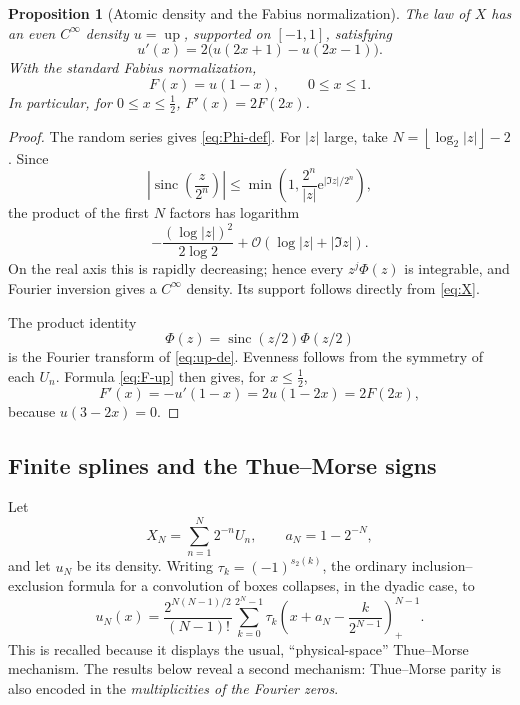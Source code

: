 \documentclass[11pt,oneside]{article}
\newtheorem{proposition}[theorem]{Proposition}
\theoremstyle{definition}
\theoremstyle{remark}
\newcommand{\Up}{\operatorname{up}}
\newcommand{\sinc}{\operatorname{sinc}}
\newcommand{\e}{\mathrm e}
\newcommand{\bigO}{\mathcal O}
\begin{document}
\begin{proposition}[Atomic density and the Fabius normalization]
\label{prop:density}
The law of \(X\) has an even \(C^\infty\) density \(u=\Up\), supported on
\([-1,1]\), satisfying
\begin{equation}
 u'(x)=2\bigl(u(2x+1)-u(2x-1)\bigr).
 \label{eq:up-de}
\end{equation}
With the standard Fabius normalization,
\begin{equation}
 F(x)=u(1-x),\qquad 0\leq x\leq1.
 \label{eq:F-up}
\end{equation}
In particular, for \(0\leq x\leq\frac12\),
\(F'(x)=2F(2x)\).
\end{proposition}

\begin{proof}
The random series gives \eqref{eq:Phi-def}.  For \(|z|\) large, take
\(N=\left\lfloor\log_2|z|\right\rfloor-2\).  Since
\[
 \left|\sinc\!\left(\frac z{2^n}\right)\right|
 \leq \min\!\left(1,\frac{2^n}{|z|}\e^{|\Im z|/2^n}\right),
\]
the product of the first \(N\) factors has logarithm
\[
 -\frac{(\log|z|)^2}{2\log2}+\bigO(\log|z|+|\Im z|).
\]
On the real axis this is rapidly decreasing; hence every
\(z^j\Phi(z)\) is integrable, and Fourier inversion gives a \(C^\infty\)
density.  Its support follows directly from \eqref{eq:X}.

The product identity
\[
 \Phi(z)=\sinc(z/2)\Phi(z/2)
\]
is the Fourier transform of \eqref{eq:up-de}.  Evenness follows from the
symmetry of each \(U_n\).  Formula \eqref{eq:F-up} then gives, for
\(x\leq\frac12\),
\[
 F'(x)=-u'(1-x)
      =2u(1-2x)=2F(2x),
\]
because \(u(3-2x)=0\).
\end{proof}

\subsection{Finite splines and the Thue--Morse signs}

Let
\[
 X_N=\sum_{n=1}^{N}2^{-n}U_n,
 \qquad
 a_N=1-2^{-N},
\]
and let \(u_N\) be its density.  Writing
\(\tau_k=(-1)^{s_2(k)}\), the ordinary inclusion--exclusion formula for a
convolution of boxes collapses, in the dyadic case, to
\begin{equation}
 u_N(x)=
 \frac{2^{N(N-1)/2}}{(N-1)!}
 \sum_{k=0}^{2^N-1}
 \tau_k
 \left(
   x+a_N-\frac{k}{2^{N-1}}
 \right)_{+}^{N-1}.
 \label{eq:finite-spline}
\end{equation}
This is recalled because it displays the usual, ``physical-space''
Thue--Morse mechanism.  The results below reveal a second mechanism:
Thue--Morse parity is also encoded in the \emph{multiplicities of the
Fourier zeros}.
\end{document}
